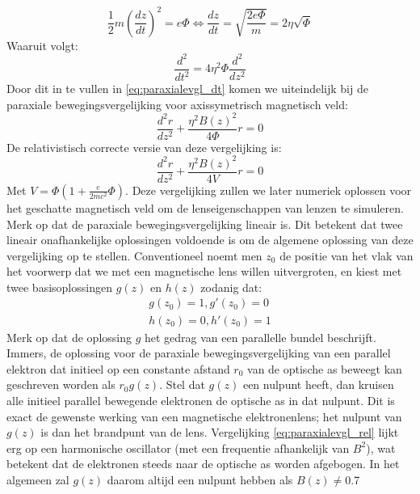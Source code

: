 \documentclass[we,twoside,openright,a4paper,11pt]{uantwerpenbamathesis}
\begin{document}
\begin{equation}
    \frac{1}{2}m\left(\frac{dz}{dt}\right)^2=e\Phi\Leftrightarrow\frac{dz}{dt}=\sqrt{\frac{2e\Phi}{m}}=2\eta\sqrt{\Phi}
\end{equation}
Waaruit volgt:
\begin{equation}
    \frac{d^2}{dt^2}=4\eta^2\Phi\frac{d^2}{dz^2}
\end{equation}
Door dit in te vullen in \ref{eq:paraxialevgl_dt} komen we uiteindelijk bij de paraxiale bewegingsvergelijking voor axissymetrisch magnetisch veld:
\begin{equation}\label{eq:paraxialevgl}
    \frac{d^2r}{dz^2}+\frac{\eta^2B(z)^2}{4\Phi}r=0
\end{equation}
De relativistisch correcte versie van deze vergelijking is:
\begin{equation}\label{eq:paraxialevgl_rel}
    \frac{d^2r}{dz^2}+\frac{\eta^2B(z)^2}{4V}r=0
\end{equation}
Met $V=\Phi\left(1+\frac{e}{2mc^2}\Phi\right)$. Deze vergelijking zullen we later numeriek oplossen voor het geschatte magnetisch veld om de lenseigenschappen van lenzen te simuleren. \\

Merk op dat de paraxiale bewegingsvergelijking lineair is. Dit betekent dat twee lineair onafhankelijke oplossingen voldoende is om de algemene oplossing van deze vergelijking op te stellen. Conventioneel noemt men $z_0$ de positie van het vlak van het voorwerp dat we met een magnetische lens willen uitvergroten, en kiest met twee basisoplossingen $g(z)$ en $h(z)$ zodanig dat:
\begin{align}\label{eq:gh}
    g(z_0)=1, g'(z_0)=0 \\[6pt]
    h(z_0)=0, h'(z_0)=1
\end{align}
Merk op dat de oplossing $g$ het gedrag van een parallelle bundel beschrijft. Immers, de oplossing voor de paraxiale bewegingsvergelijking van een parallel elektron dat initieel op een constante afstand $r_0$ van de optische as beweegt kan geschreven worden als $r_0g(z)$. Stel dat $g(z)$ een nulpunt heeft, dan kruisen alle initieel parallel bewegende elektronen de optische as in dat nulpunt. Dit is exact de gewenste werking van een magnetische elektronenlens; het nulpunt van $g(z)$ is dan het brandpunt van de lens. Vergelijking \ref{eq:paraxialevgl_rel} lijkt erg op een harmonische oscillator (met een frequentie afhankelijk van $B^2$), wat betekent dat de elektronen steeds naar de optische as worden afgebogen. In het algemeen zal $g(z)$ daarom altijd een nulpunt hebben als $B(z)\neq0$.7
\end{document}
